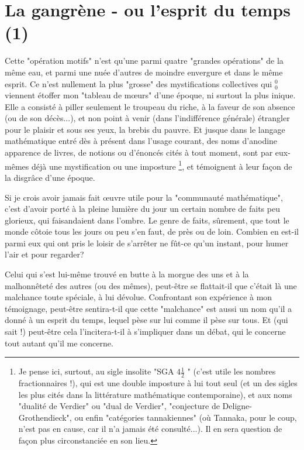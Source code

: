 \section{La gangrène - ou l'esprit du temps (1)}

Cette "opération motifs" n'est qu'une parmi quatre "grandes opérations" de la même eau, et parmi une nuée d'autres de moindre envergure et dans le même esprit. Ce n'est nullement la plus "grosse" des mystifications collectives qui ${ }_{0}^{0}$ viennent étoffer mon "tableau de mœurs" d'une époque, ni surtout la plus inique. Elle a consisté à piller seulement le troupeau du riche, à la faveur de son absence (ou de son décès...), et non point à venir (dans l'indifférence générale) étrangler pour le plaisir et sous ses yeux, la brebis du pauvre. Et jusque dans le langage mathématique entré dès à présent dans l'usage courant, des noms d'anodine apparence de livres, de notions ou d'énoncés cités à tout moment, sont par eux-mêmes déjà une mystification ou une imposture \footnote{Je pense ici, surtout, au sigle insolite "SGA $4 \frac{1}{2}$ " (c'est utile les nombres fractionnaires !), qui est une double imposture à lui tout seul (et un des sigles les plus cités dans la littérature mathématique contemporaine), et aux noms "dualité de Verdier" ou "dual de Verdier", "conjecture de Deligne-Grothendieck", ou enfin "catégories tannakiennes" (où Tannaka, pour le coup, n'est pas en cause, car il n'a jamais été consulté...). Il en sera question de façon plus circonstanciée en son lieu.}, et témoignent à leur façon de la disgrâce d'une époque.

Si je crois avoir jamais fait œuvre utile pour la "communauté mathématique", c'est d'avoir porté à la pleine lumière du jour un certain nombre de faits peu glorieux, qui faisandaient dans l'ombre. Le genre de faits, sûrement, que tout le monde côtoie tous les jours ou peu s'en faut, de près ou de loin. Combien en est-il parmi eux qui ont pris le loisir de s'arrêter ne fût-ce qu'un instant, pour humer l'air et pour regarder?

Celui qui s'est lui-même trouvé en butte à la morgue des uns et à la malhonnêteté des autres (ou des mêmes), peut-être se flattait-il que c'était là une malchance toute spéciale, à lui dévolue. Confrontant son expérience à mon témoignage, peut-être sentira-t-il que cette "malchance" est aussi un nom qu'il a donné à un esprit du temps, lequel pèse sur lui comme il pèse sur tous. Et (qui sait !) peut-être cela l'incitera-t-il à s'impliquer dans un débat, qui le concerne tout autant qu'il me concerne.

